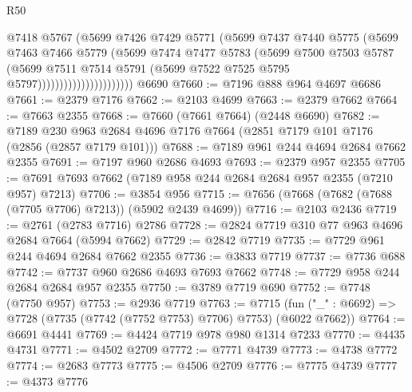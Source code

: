 \begin{lexlean}{R50}
\begin{coremodule}
                                  @7418
                                  @5767
                                  (@5699
                                    @7426
                                    @7429
                                    @5771
                                    (@5699
                                      @7437
                                      @7440
                                      @5775
                                      (@5699
                                        @7463
                                        @7466
                                        @5779
                                        (@5699
                                          @7474
                                          @7477
                                          @5783
                                          (@5699
                                            @7500
                                            @7503
                                            @5787
                                            (@5699
                                              @7511
                                              @7514
                                              @5791
                                              (@5699 @7522 @7525 @5795 @5797))))))))))))))))))))))
    @6690
@7660 := @7196 @888 @964 @4697 @6686
@7661 := @2379 @7176
@7662 := @2103 @4699
@7663 := @2379 @7662
@7664 := @7663 @2355
@7668 := @7660 (@7661 @7664) (@2448 @6690)
@7682 := @7189 @230 @963 @2684 @4696 @7176 @7664 (@2851 @7179 @101 @7176 (@2856 (@2857 @7179 @101)))
@7688 := @7189 @961 @244 @4694 @2684 @7662 @2355
@7691 := @7197 @960 @2686 @4693
@7693 := @2379 @957 @2355
@7705 := @7691 @7693 @7662 (@7189 @958 @244 @2684 @2684 @957 @2355 (@7210 @957) @7213)
@7706 := @3854 @956
@7715 := @7656 (@7668 (@7682 (@7688 (@7705 @7706) @7213)) (@5902 @2439 @4699))
@7716 := @2103 @2436
@7719 := @2761 (@2783 @7716) @2786
@7728 := @2824 @7719 @310 @77 @963 @4696 @2684 @7664 (@5994 @7662)
@7729 := @2842 @7719
@7735 := @7729 @961 @244 @4694 @2684 @7662 @2355
@7736 := @3833 @7719
@7737 := @7736 @688
@7742 := @7737 @960 @2686 @4693 @7693 @7662
@7748 := @7729 @958 @244 @2684 @2684 @957 @2355
@7750 := @3789 @7719 @690
@7752 := @7748 (@7750 @957)
@7753 := @2936 @7719
@7763 := @7715 (fun ("_" : @6692) => @7728 (@7735 (@7742 (@7752 @7753) @7706) @7753) (@6022 @7662))
@7764 := @6691 @4441
@7769 := @4424 @7719 @978 @980 @1314 @7233
@7770 := @4435 @4731
@7771 := @4502 @2709
@7772 := @7771 @4739
@7773 := @4738 @7772
@7774 := @2683 @7773
@7775 := @4506 @2709
@7776 := @7775 @4739
@7777 := @4373 @7776

\end{coremodule}
\end{lexlean}
